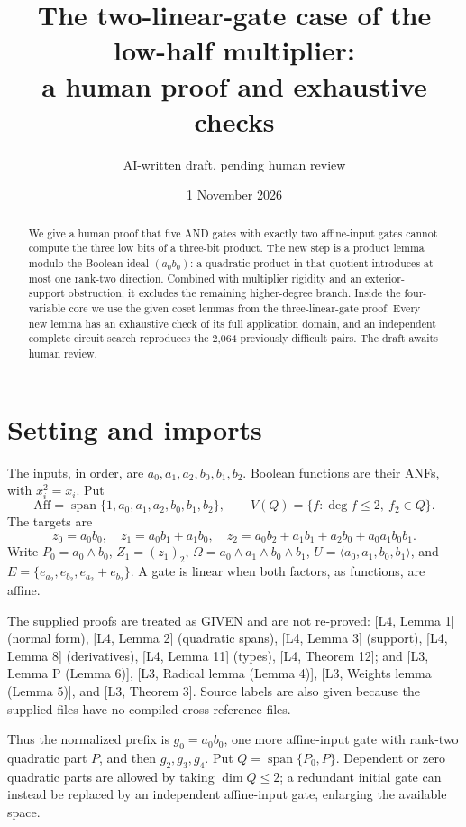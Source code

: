 \documentclass[11pt,a4paper]{article}
\title{The two-linear-gate case of the low-half multiplier:\\a human proof and exhaustive checks}
\author{AI-written draft, pending human review}
\date{1 November 2026}
\newcommand{\Aff}{\mathrm{Aff}}
\newcommand{\Span}{\operatorname{span}}
\begin{document}
\maketitle
\begin{abstract}
We give a human proof that five AND gates with exactly two affine-input gates cannot compute the three low bits of a three-bit product. The new step is a product lemma modulo the Boolean ideal $(a_0b_0)$: a quadratic product in that quotient introduces at most one rank-two direction. Combined with multiplier rigidity and an exterior-support obstruction, it excludes the remaining higher-degree branch. Inside the four-variable core we use the given coset lemmas from the three-linear-gate proof. Every new lemma has an exhaustive check of its full application domain, and an independent complete circuit search reproduces the 2,064 previously difficult pairs. The draft awaits human review.
\end{abstract}

\section{Setting and imports}
The inputs, in order, are $a_0,a_1,a_2,b_0,b_1,b_2$. Boolean functions are their ANFs, with $x_i^2=x_i$. Put
\[
\Aff=\Span\{1,a_0,a_1,a_2,b_0,b_1,b_2\},\qquad
V(Q)=\{f:\deg f\le2,\ f_2\in Q\}.
\]
The targets are
\[
z_0=a_0b_0,\quad z_1=a_0b_1+a_1b_0,\quad
z_2=a_0b_2+a_1b_1+a_2b_0+a_0a_1b_0b_1.
\]
Write $P_0=a_0\wedge b_0$, $Z_1=(z_1)_2$, $\Omega=a_0\wedge a_1\wedge b_0\wedge b_1$, $U=\langle a_0,a_1,b_0,b_1\rangle$, and $E=\{e_{a_2},e_{b_2},e_{a_2}+e_{b_2}\}$. A gate is linear when both factors, as functions, are affine.

The supplied proofs are treated as GIVEN and are not re-proved: [L4, Lemma 1] (normal form), [L4, Lemma 2] (quadratic spans), [L4, Lemma 3] (support), [L4, Lemma 8] (derivatives), [L4, Lemma 11] (types), [L4, Theorem 12]; and [L3, Lemma P (Lemma 6)], [L3, Radical lemma (Lemma 4)], [L3, Weights lemma (Lemma 5)], and [L3, Theorem 3]. Source labels are also given because the supplied files have no compiled cross-reference files.

Thus the normalized prefix is $g_0=a_0b_0$, one more affine-input gate with rank-two quadratic part $P$, and then $g_2,g_3,g_4$. Put $Q=\Span\{P_0,P\}$. Dependent or zero quadratic parts are allowed by taking $\dim Q\le2$; a redundant initial gate can instead be replaced by an independent affine-input gate, enlarging the available space.
\end{document}
